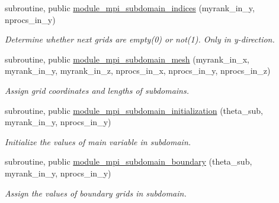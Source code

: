 \begin{DoxyCompactItemize}
subroutine, public \mbox{\hyperlink{namespacemodule__mpi__subdomain_a407d55f604c25fca086515a66980f67b}{module\+\_\+mpi\+\_\+subdomain\+\_\+indices}} (myrank\+\_\+in\+\_\+y, nprocs\+\_\+in\+\_\+y)
\begin{DoxyCompactList}\small\item\em Determine whether next grids are empty(0) or not(1). Only in y-\/direction. \end{DoxyCompactList}\item 
subroutine, public \mbox{\hyperlink{namespacemodule__mpi__subdomain_a73f1a66627a730c3906f200d9d31f974}{module\+\_\+mpi\+\_\+subdomain\+\_\+mesh}} (myrank\+\_\+in\+\_\+x, myrank\+\_\+in\+\_\+y, myrank\+\_\+in\+\_\+z, nprocs\+\_\+in\+\_\+x, nprocs\+\_\+in\+\_\+y, nprocs\+\_\+in\+\_\+z)
\begin{DoxyCompactList}\small\item\em Assign grid coordinates and lengths of subdomains. \end{DoxyCompactList}\item 
subroutine, public \mbox{\hyperlink{namespacemodule__mpi__subdomain_a0be56ce2507138a1364de11e15f2bc7f}{module\+\_\+mpi\+\_\+subdomain\+\_\+initialization}} (theta\+\_\+sub, myrank\+\_\+in\+\_\+y, nprocs\+\_\+in\+\_\+y)
\begin{DoxyCompactList}\small\item\em Initialize the values of main variable in subdomain. \end{DoxyCompactList}\item 
subroutine, public \mbox{\hyperlink{namespacemodule__mpi__subdomain_a3ebf20fcc8a3cd5d916adddf69af4833}{module\+\_\+mpi\+\_\+subdomain\+\_\+boundary}} (theta\+\_\+sub, myrank\+\_\+in\+\_\+y, nprocs\+\_\+in\+\_\+y)
\begin{DoxyCompactList}\small\item\em Assign the values of boundary grids in subdomain. \end{DoxyCompactList}\end{DoxyCompactItemize}
